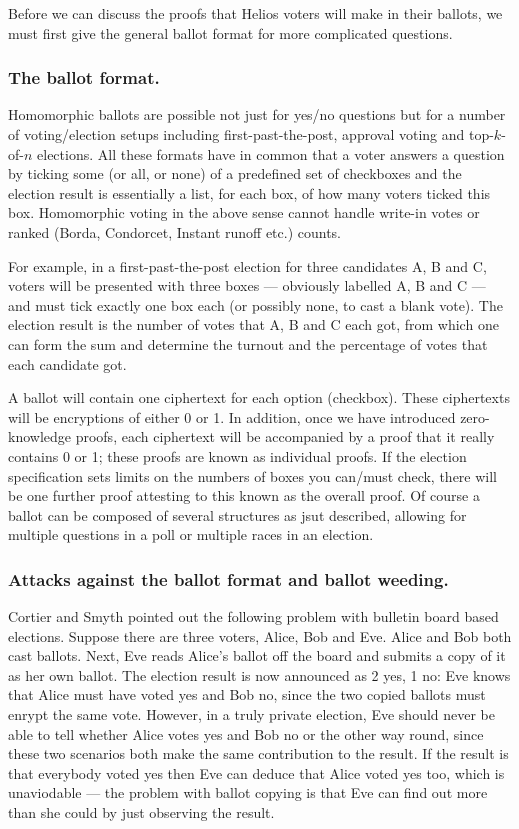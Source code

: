 \documentclass{llncs}
\begin{document}
Before we can discuss the proofs that Helios voters will make in their ballots,
we must first give the general ballot format for more complicated questions.

\subsubsection{The ballot format.}
Homomorphic ballots are possible not just for yes/no questions but for a number
of voting/election setups including first-past-the-post, approval voting and
top-$k$-of-$n$ elections. All these formats have in common that a voter answers
a question by ticking some (or all, or none) of a predefined set of checkboxes
and the election result is essentially a list, for each box, of how many voters
ticked this box.
Homomorphic voting in the above sense cannot handle write-in votes or ranked
(Borda, Condorcet, Instant runoff etc.) counts.

For example, in a first-past-the-post election for three candidates A, B and C,
voters will be presented with three boxes --- obviously labelled A, B and C ---
and must tick exactly one box each (or possibly none, to cast a blank vote). The
election result is the number of votes that A, B and C each got, from which one
can form the sum and determine the turnout and the percentage of votes that each
candidate got.

A ballot will contain one ciphertext for each option (checkbox). These
ciphertexts will be encryptions of either 0 or 1. In addition, once we have
introduced zero-knowledge proofs, each ciphertext will be accompanied by a proof
that it really contains 0 or 1; these proofs are known as individual proofs. If
the election specification sets limits on the numbers of boxes you can/must
check, there will be one further proof attesting to this known as the overall
proof. Of course a ballot can be composed of several structures as jsut
described, allowing for multiple questions in a poll or multiple races in an
election.

\subsubsection{Attacks against the ballot format and ballot weeding.}
Cortier and Smyth \cite{CS???} pointed out the following problem with bulletin
board based elections. Suppose there are three voters, Alice, Bob and Eve. Alice
and Bob both cast ballots. Next, Eve reads Alice's ballot off the board and
submits a copy of it as her own ballot. The election result is now announced as
2 yes, 1 no: Eve knows that Alice must have voted yes and Bob no, since the two
copied ballots must enrypt the same vote. However, in a truly private election,
Eve should never be able to tell whether Alice votes yes and Bob no or the other
way round, since these two scenarios both make the same contribution to the
result. If the result is that everybody voted yes then Eve can deduce that Alice
voted yes too, which is unaviodable --- the problem with ballot copying is that
Eve can find out more than she could by just observing the result.
\end{document}
